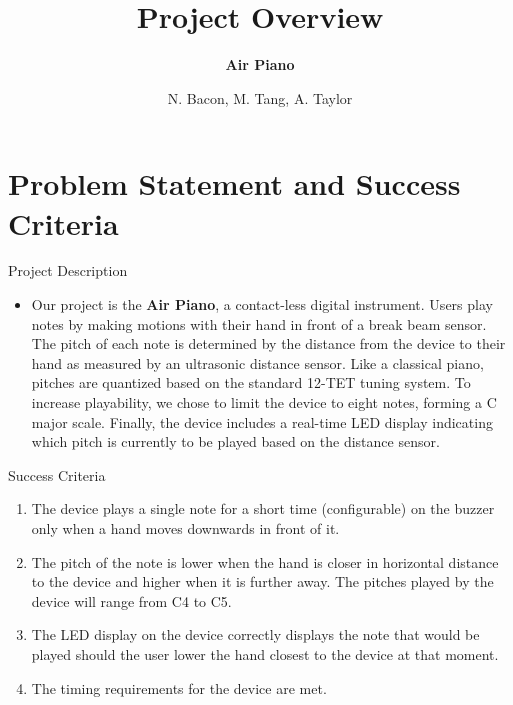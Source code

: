 \documentclass[
11pt,notheorems,hyperref={pdfauthor=whatever}
]{beamer}
\title[
]{Project Overview}
\subtitle{\textbf{Air Piano}}
\author[
]{
    N. Bacon, M. Tang, A. Taylor
}
\begin{document}
{
\begin{frame}
  \titlepage
\end{frame}
}
\addtocounter{framenumber}{-1}

\section{Problem Statement and Success Criteria}
\begin{frame}

\begin{block}{Project Description}
\begin{itemize}
    \item Our project is the \textbf{Air Piano}, a
    contact-less digital instrument. Users play
    notes by making motions with their hand
    in front of a break beam sensor. The pitch of each
    note is determined by the distance from the
    device to their hand as measured by an ultrasonic
    distance sensor. Like a classical piano, pitches
    are quantized based on the standard 12-TET tuning
    system. To increase playability, we chose to limit
    the device to eight notes, forming a C major scale.
    Finally, the device includes a real-time LED
    display indicating which pitch is currently
    to be played based on the distance sensor.
\end{itemize}
\end{block}

\begin{block}{Success Criteria}
\begin{enumerate}
    \item The device plays a single note for a short
        time (configurable) on the buzzer
        only when a hand moves downwards in front of it.
    \item The pitch of the note is lower when the hand
        is closer in horizontal distance to the device
        and higher when it is further away. The pitches
        played by the device will range from C4 to C5.
    \item The LED display on the device correctly
    displays the note that would be played should the
    user lower the hand closest to the device at that
    moment.
    \item The timing requirements for the device are
        met.
\end{enumerate}
\end{block}

\end{frame}
\end{document}
